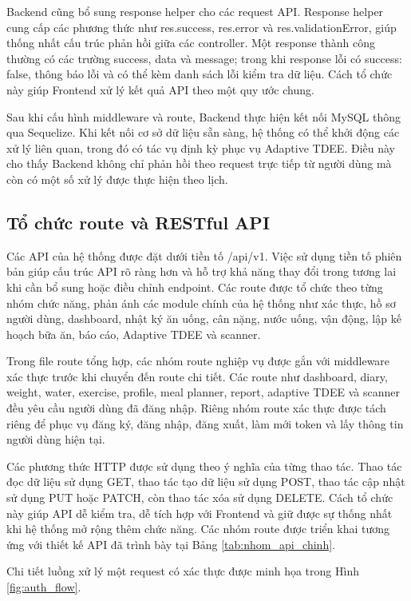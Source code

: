 \documentclass[12pt, a4paper]{report}
\begin{document}
Backend cũng bổ sung response helper cho các request API. Response helper cung cấp các phương thức như res.success, res.error và res.validationError, giúp thống nhất cấu trúc phản hồi giữa các controller. Một response thành công thường có các trường success, data và message; trong khi response lỗi có success: false, thông báo lỗi và có thể kèm danh sách lỗi kiểm tra dữ liệu. Cách tổ chức này giúp Frontend xử lý kết quả API theo một quy ước chung.

Sau khi cấu hình middleware và route, Backend thực hiện kết nối MySQL thông qua Sequelize. Khi kết nối cơ sở dữ liệu sẵn sàng, hệ thống có thể khởi động các xử lý liên quan, trong đó có tác vụ định kỳ phục vụ Adaptive TDEE. Điều này cho thấy Backend không chỉ phản hồi theo request trực tiếp từ người dùng mà còn có một số xử lý được thực hiện theo lịch.

\subsection{Tổ chức route và RESTful API}Các API của hệ thống được đặt dưới tiền tố /api/v1. Việc sử dụng tiền tố phiên bản giúp cấu trúc API rõ ràng hơn và hỗ trợ khả năng thay đổi trong tương lai khi cần bổ sung hoặc điều chỉnh endpoint. Các route được tổ chức theo từng nhóm chức năng, phản ánh các module chính của hệ thống như xác thực, hồ sơ người dùng, dashboard, nhật ký ăn uống, cân nặng, nước uống, vận động, lập kế hoạch bữa ăn, báo cáo, Adaptive TDEE và scanner.

Trong file route tổng hợp, các nhóm route nghiệp vụ được gắn với middleware xác thực trước khi chuyển đến route chi tiết. Các route như dashboard, diary, weight, water, exercise, profile, meal planner, report, adaptive TDEE và scanner đều yêu cầu người dùng đã đăng nhập. Riêng nhóm route xác thực được tách riêng để phục vụ đăng ký, đăng nhập, đăng xuất, làm mới token và lấy thông tin người dùng hiện tại.

Các phương thức HTTP được sử dụng theo ý nghĩa của từng thao tác. Thao tác đọc dữ liệu sử dụng GET, thao tác tạo dữ liệu sử dụng POST, thao tác cập nhật sử dụng PUT hoặc PATCH, còn thao tác xóa sử dụng DELETE. Cách tổ chức này giúp API dễ kiểm tra, dễ tích hợp với Frontend và giữ được sự thống nhất khi hệ thống mở rộng thêm chức năng. Các nhóm route được triển khai tương ứng với thiết kế API đã trình bày tại Bảng \ref{tab:nhom_api_chinh}.

Chi tiết luồng xử lý một request có xác thực được minh họa trong Hình \ref{fig:auth_flow}.
\end{document}
